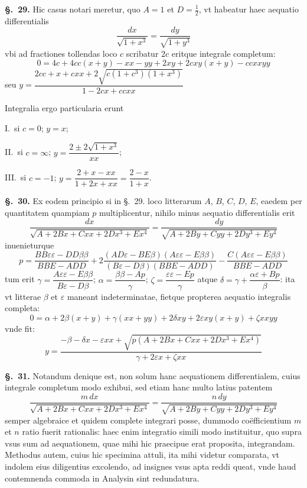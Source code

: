 \documentclass{article}
\begin{document}
\textbf{§.~29.} Hic casus notari meretur, quo $A = 1$ et $D = \frac{1}{2}$, vt habeatur haec
aequatio differentialis
\[ \frac{dx}{\sqrt{1 + x^{3}}} = \frac{dy}{\sqrt{1 + y^{3}}} \]
vbi ad fractiones tollendas loco $c$ scribatur $2c$ eritque integrale completum:
\[ 0 = 4c + 4cc(x+y) - xx - yy + 2xy + 2cxy(x+y) - ccxxyy \]
seu $y = \dfrac{2cc + x + cxx + 2\sqrt{c(1+c^{3})(1+x^{3})}}{1 - 2cx + ccxx}$

Integralia ergo particularia erunt

I.~si $c = 0$; $y = x$;

II.~si $c = \infty$; $y = \dfrac{2 \pm 2\sqrt{1+x^{3}}}{xx}$;

III.~si $c = -1$; $y = \dfrac{2 + x - xx}{1 + 2x + xx} = \dfrac{2-x}{1+x}$.

\textbf{§.~30.} Ex eodem principio si in §.~29. loco litterarum $A$, $B$, $C$, $D$, $E$,
eaedem per quantitatem quampiam $p$ multiplicentur, nihilo minus aequatio differentialis erit
\[ \frac{dx}{\sqrt{A + 2Bx + Cxx + 2Dx^{3} + Ex^{4}}} = \frac{dy}{\sqrt{A + 2By + Cyy + 2Dy^{3} + Ey^{4}}} \]
inuenieturque
\[ p = \frac{BB\varepsilon\varepsilon - DD\beta\beta}{BBE - ADD}
   + 2\frac{(AD\varepsilon - BE\beta)(A\varepsilon\varepsilon - E\beta\beta)}{(B\varepsilon - D\beta)(BBE - ADD)}
   - \frac{C(A\varepsilon\varepsilon - E\beta\beta)}{BBE - ADD} \]
tum erit $\gamma = \dfrac{A\varepsilon\varepsilon - E\beta\beta}{B\varepsilon - D\beta}$;
$\alpha = \dfrac{\beta\beta - Ap}{\gamma}$; $\zeta = \dfrac{\varepsilon\varepsilon - Ep}{\gamma}$ atque
$\delta = \gamma + \dfrac{\alpha\varepsilon + Bp}{\beta}$: ita vt litterae $\beta$ et $\varepsilon$ maneant
indeterminatae, fietque propterea aequatio integralis completa:
\[ 0 = \alpha + 2\beta(x+y) + \gamma(xx+yy) + 2\delta xy + 2\varepsilon xy(x+y) + \zeta xxyy \]
vnde fit:
\[ y = \frac{-\beta - \delta x - \varepsilon xx + \sqrt{p(A + 2Bx + Cxx + 2Dx^{3} + Ex^{4})}}{\gamma + 2\varepsilon x + \zeta xx} \]

\textbf{§.~31.} Notandum denique est, non solum hanc aequationem differentialem, cuius
integrale completum modo exhibui, sed etiam hanc multo latius patentem
\[ \frac{m\,dx}{\sqrt{A + 2Bx + Cxx + 2Dx^{3} + Ex^{4}}} = \frac{n\,dy}{\sqrt{A + 2By + Cyy + 2Dy^{3} + Ey^{4}}} \]
semper algebraice et quidem complete integrari posse, dummodo coëfficientium $m$ et $n$ ratio
fuerit rationalis: haec enim integratio simili modo instituitur, quo supra vsus sum ad aequationem,
quae mihi hic praecipue erat proposita, integrandam. Methodus autem, cuius
hic specimina attuli, ita mihi videtur comparata, vt indolem eius diligentius excolendo, ad
insignes vsus apta reddi queat, vnde haud contemnenda commoda in Analysin sint redundatura.
\end{document}
